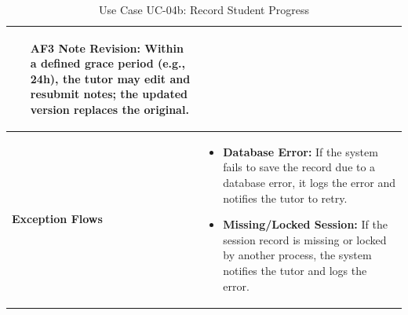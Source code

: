 \begin{table}[H]
\begin{tabular}{|p{3cm}|p{11cm}|}
\begin{itemize}
    \item[AF3] \textbf{Note Revision:} Within a defined grace period (e.g., 24h), the tutor may edit and resubmit notes; the updated version replaces the original.
\end{itemize} \\ 
\hline
\textbf{Exception Flows} & 
\begin{itemize}
    \item \textbf{Database Error:} If the system fails to save the record due to a database error, it logs the error and notifies the tutor to retry.
    \item \textbf{Missing/Locked Session:} If the session record is missing or locked by another process, the system notifies the tutor and logs the error.
\end{itemize} \\ 
\hline
\end{tabular}
\caption{Use Case UC-04b: Record Student Progress}
\end{table}

